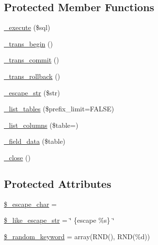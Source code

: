 \subsection*{Protected Member Functions}
\begin{DoxyCompactItemize}
\item 
\mbox{\hyperlink{class_c_i___d_b__odbc__driver_a114ab675d89bf8324a41785fb475e86d}{\+\_\+execute}} (\$sql)
\item 
\mbox{\hyperlink{class_c_i___d_b__odbc__driver_ac81ac882c1d54347d810199a15856aac}{\+\_\+trans\+\_\+begin}} ()
\item 
\mbox{\hyperlink{class_c_i___d_b__odbc__driver_a6fe7f373e0b11cfae23a5f41c0b35dda}{\+\_\+trans\+\_\+commit}} ()
\item 
\mbox{\hyperlink{class_c_i___d_b__odbc__driver_ad49a116b0776c26b53114c9093fd102a}{\+\_\+trans\+\_\+rollback}} ()
\item 
\mbox{\hyperlink{class_c_i___d_b__odbc__driver_af8ef0237bfcdb19215b63fff769e7a55}{\+\_\+escape\+\_\+str}} (\$str)
\item 
\mbox{\hyperlink{class_c_i___d_b__odbc__driver_a435c0f3ce54fe7daa178baa8532ebd54}{\+\_\+list\+\_\+tables}} (\$prefix\+\_\+limit=F\+A\+L\+SE)
\item 
\mbox{\hyperlink{class_c_i___d_b__odbc__driver_a7ccb7f9c301fe7f0a9db701254142b63}{\+\_\+list\+\_\+columns}} (\$table=\textquotesingle{}\textquotesingle{})
\item 
\mbox{\hyperlink{class_c_i___d_b__odbc__driver_a95247d9671893adc3444cb184ad32ea1}{\+\_\+field\+\_\+data}} (\$table)
\item 
\mbox{\hyperlink{class_c_i___d_b__odbc__driver_a4d9082658000e5ede8312067c6dda9db}{\+\_\+close}} ()
\end{DoxyCompactItemize}
\subsection*{Protected Attributes}
\begin{DoxyCompactItemize}
\item 
\mbox{\hyperlink{class_c_i___d_b__odbc__driver_aaec2fb0112850159063a8e47ad3aed6e}{\$\+\_\+escape\+\_\+char}} = \textquotesingle{}\textquotesingle{}
\item 
\mbox{\hyperlink{class_c_i___d_b__odbc__driver_adf86ecadf3d0e1ce3f5e0eaeeb3867ae}{\$\+\_\+like\+\_\+escape\+\_\+str}} = \char`\"{} \{escape \textquotesingle{}\%s\textquotesingle{}\} \char`\"{}
\item 
\mbox{\hyperlink{class_c_i___d_b__odbc__driver_a10213aa6e05f6d924d3277bb1d2fea00}{\$\+\_\+random\+\_\+keyword}} = array(\textquotesingle{}R\+ND()\textquotesingle{}, \textquotesingle{}R\+ND(\%d)\textquotesingle{})
\end{DoxyCompactItemize}


